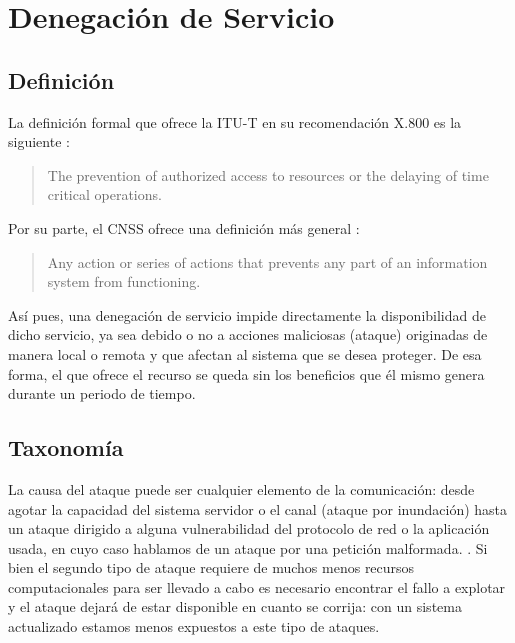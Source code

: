 \section{Denegación de Servicio}\label{sec:Denegacion de Servicio}
\subsection{Definición}\label{ssec:dos definicion}

La definición formal que ofrece la \gls{ITU-T} en su recomendación X.800 es la siguiente \cite{ITU-T_DDoS_def}:

\begin{quote}
 The prevention of authorized access to resources or the delaying of time critical operations.
\end{quote}

Por su parte, el \gls{CNSS} ofrece una definición más general \cite{CCNS_DDoS_def}:

\begin{quote}
 Any action or series of actions that prevents any part of an information system from functioning.
\end{quote}

Así pues, una denegación de servicio impide directamente la disponibilidad de dicho servicio, ya sea debido o no 
a acciones maliciosas (ataque) originadas de manera local o remota y que afectan al sistema que se desea 
proteger. 
De esa forma, el que ofrece el recurso se queda sin los beneficios que él mismo genera durante un periodo de tiempo. %

\subsection{Taxonomía}\label{ssec:dos taxonomia}

La causa del ataque puede ser cualquier elemento de la comunicación: desde agotar
la capacidad del sistema servidor o el canal (ataque por inundación)
hasta un ataque dirigido a alguna vulnerabilidad del protocolo de red o la aplicación usada,
en cuyo caso hablamos de un ataque por una petición malformada.
\cite{Raghavan}. 
Si bien el segundo tipo  de ataque requiere de muchos menos recursos computacionales para
ser llevado a cabo es necesario encontrar el fallo a explotar y el ataque dejará de estar
disponible en cuanto se corrija: con un sistema actualizado estamos menos expuestos
a este tipo de ataques.

